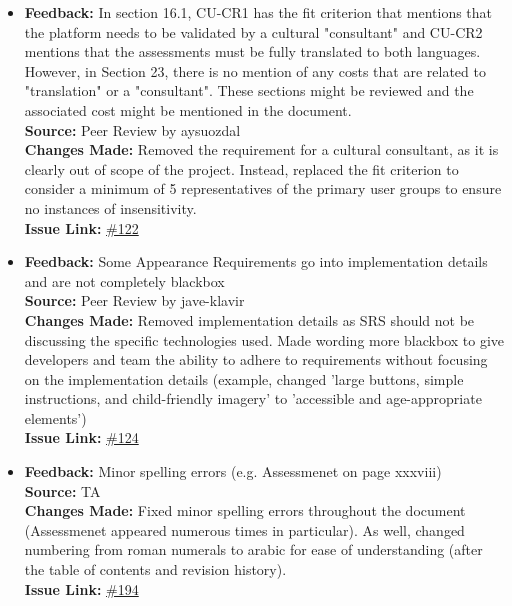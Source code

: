 \documentclass{article}
\begin{document}
\begin{itemize}
  \item 
    \textbf{Feedback:} In section 16.1, CU-CR1 has the fit criterion that mentions that the platform needs to be validated by a cultural "consultant" and CU-CR2 mentions that the assessments must be fully translated to both languages. However, in Section 23, there is no mention of any costs that are related to "translation" or a "consultant". These sections might be reviewed and the associated cost might be mentioned in the document. \\
    \textbf{Source:} Peer Review by aysuozdal\\
    \textbf{Changes Made:} Removed the requirement for a cultural consultant, as it is clearly out of scope of the project. Instead, replaced the fit criterion to consider a minimum of 5 representatives of the primary user groups to ensure no instances of insensitivity.\\
    \textbf{Issue Link:} \href{https://github.com/parishanizam/TeleHealth/issues/122}{\#122}
  
  \item 
    \textbf{Feedback:} Some Appearance Requirements go into implementation details and are not completely blackbox\\
    \textbf{Source:} Peer Review by jave-klavir\\
    \textbf{Changes Made:} Removed implementation details as SRS should not be discussing the specific technologies used. Made wording more blackbox to give developers and team the ability to adhere to requirements without focusing on the implementation details (example, changed 'large buttons, simple instructions, and child-friendly imagery' to 'accessible and age-appropriate elements')\\
    \textbf{Issue Link:} \href{https://github.com/parishanizam/TeleHealth/issues/124}{\#124}
  
  \item 
    \textbf{Feedback:} Minor spelling errors (e.g. Assessmenet on page xxxviii) \\
    \textbf{Source:} TA \\
    \textbf{Changes Made:} Fixed minor spelling errors throughout the document (Assessmenet appeared numerous times in particular). As well, changed numbering from roman numerals to arabic for ease of understanding (after the table of contents and revision history). \\
    \textbf{Issue Link:} \href{https://github.com/parishanizam/TeleHealth/issues/194}{\#194}
  

\end{itemize}
\end{document}
